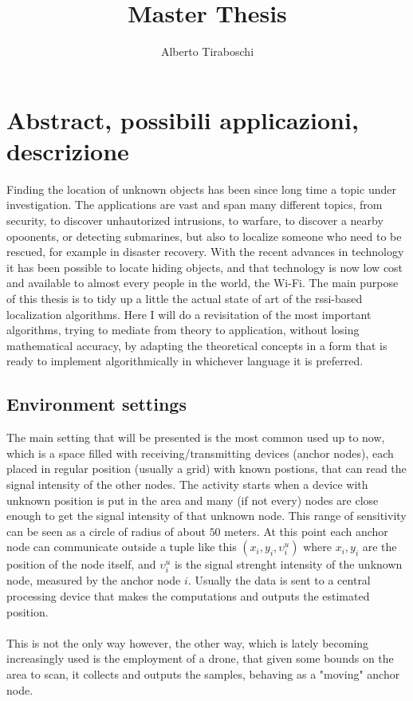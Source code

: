 \documentclass[12pt,twoside]{report}
\title{Master Thesis}
\author{Alberto Tiraboschi}
\begin{document}

\maketitle
\clearpage
\thispagestyle{empty}
\tableofcontents
\thispagestyle{empty}
\clearpage

\setcounter{page}{1}

\chapter{Abstract, possibili applicazioni, descrizione}
Finding the location of unknown objects has been since long time a topic under investigation. The applications are vast and span many different topics, from security, to discover unhautorized intrusions, to warfare, to discover a nearby opoonents, or detecting submarines, but also to localize someone who need to be rescued, for example in disaster recovery. With the recent advances in technology it has been possible to locate hiding objects, and that technology is now low cost and available to almost every people in the world, the Wi-Fi. The main purpose of this thesis is to tidy up a little the actual state of art of the rssi-based localization algorithms. Here I will do a revisitation of the most important algorithms, trying to mediate from theory to application, without losing mathematical accuracy, by adapting the theoretical concepts in a form that is ready to implement algorithmically in whichever language it is preferred.

\section{Environment settings}
The main setting that will be presented is the most common used up to now, which is a space filled with receiving/transmitting devices (anchor nodes), each placed in regular position (usually a grid) with known postions, that can read the signal intensity of the other nodes. The activity starts when a device with unknown position is put in the area and many (if not every) nodes are close enough to get the signal intensity of that unknown node. This range of sensitivity can be seen as a circle of radius of about $50$ meters. At this point each anchor node can communicate outside a tuple like this $(x_i,y_i,\upsilon_i^u)$ where $x_i,y_i$ are the position of the node itself, and $\upsilon_i^u$ is the signal strenght intensity of the unknown node, measured by the anchor node $i$. Usually the data is sent to a central processing device that makes the computations and outputs the estimated position. \\\\
This is not the only way however, the other way, which is lately becoming increasingly used is the employment of a drone, that given some bounds on the area to scan, it collects and outputs the samples, behaving as a "moving" anchor node.
\end{document}
